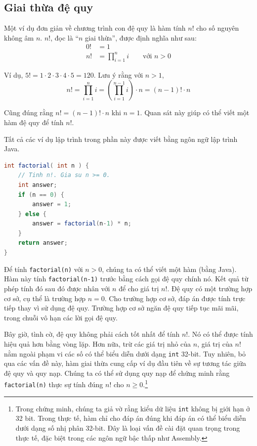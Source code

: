 \subsection{Giai thừa đệ quy}

Một ví dụ đơn giản về chương trình con đệ quy là hàm tính $n!$ cho số nguyên không âm $n$. $n!$, đọc là ``$n$ giai thừa'', được định nghĩa như sau:
\begin{align*}
0! &= 1 \\
n! &= \prod_{i=1}^{n} i \qquad \text{với } n > 0
\end{align*}

Ví dụ, $5! = 1 \cdot 2 \cdot 3 \cdot 4 \cdot 5 = 120$. Lưu ý rằng với $n > 1$,
\[n! = \prod_{i=1}^{n} i = \left(\prod_{i=1}^{n-1} i\right) \cdot n = (n-1)! \cdot n\]

Cũng đúng rằng $n! = (n-1)! \cdot n$ khi $n = 1$. Quan sát này giúp có thể viết một hàm đệ quy để tính $n!$.

\begin{notebox}
Tất cả các ví dụ lập trình trong phần này được viết bằng ngôn ngữ lập trình Java.
\end{notebox}

\begin{lstlisting}[language=Java]
int factorial( int n ) {
    // Tinh n!. Gia su n >= 0.
    int answer;
    if (n == 0) {
        answer = 1;
    } else {
        answer = factorial(n-1) * n;
    }
    return answer;
}
\end{lstlisting}

Để tính \texttt{factorial(n)} với $n > 0$, chúng ta có thể viết một hàm (bằng Java). Hàm này tính \texttt{factorial(n-1)} trước bằng cách gọi đệ quy chính nó. Kết quả từ phép tính đó sau đó được nhân với $n$ để cho giá trị $n!$. Đệ quy có một trường hợp cơ sở, cụ thể là trường hợp $n = 0$. Cho trường hợp cơ sở, đáp án được tính trực tiếp thay vì sử dụng đệ quy. Trường hợp cơ sở ngăn đệ quy tiếp tục mãi mãi, trong chuỗi vô hạn các lời gọi đệ quy.

Bây giờ, tình cờ, đệ quy không phải cách tốt nhất để tính $n!$. Nó có thể được tính hiệu quả hơn bằng vòng lặp. Hơn nữa, trừ các giá trị nhỏ của $n$, giá trị của $n!$ nằm ngoài phạm vi các số có thể biểu diễn dưới dạng \texttt{int} 32-bit. Tuy nhiên, bỏ qua các vấn đề này, hàm giai thừa cung cấp ví dụ đầu tiên về sự tương tác giữa đệ quy và quy nạp. Chúng ta có thể sử dụng quy nạp để chứng minh rằng \texttt{factorial(n)} thực sự tính đúng $n!$ cho $n \geq 0$.\footnote{Trong chứng minh, chúng ta giả vờ rằng kiểu dữ liệu \texttt{int} không bị giới hạn ở 32 bit. Trong thực tế, hàm chỉ cho đáp án đúng khi đáp án có thể biểu diễn dưới dạng số nhị phân 32-bit. Đây là loại vấn đề cài đặt quan trọng trong thực tế, đặc biệt trong các ngôn ngữ bậc thấp như Assembly.}


